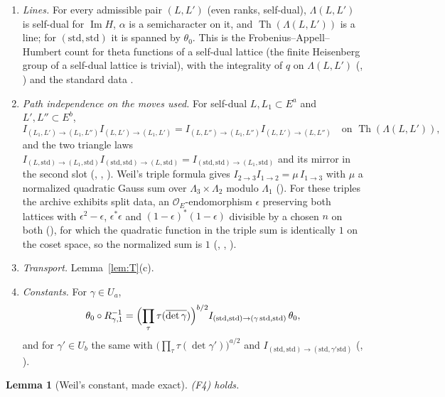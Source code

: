 \documentclass[11pt]{article}
\newcommand{\Th}{\operatorname{Th}}
\newcommand{\OEr}{\mathcal O_E}
\newtheorem{lemma}[theorem]{Lemma}
\theoremstyle{definition}
\theoremstyle{remark}
\begin{document}
\begin{enumerate}[label=(F\arabic*),leftmargin=*,itemsep=2pt]
\item \emph{Lines.} For every admissible pair $(L,L')$ (even ranks, self-dual), $\Lambda(L,L')$ is self-dual for $\operatorname{Im}H$, $\alpha$ is a semicharacter on it, and $\Th(\Lambda(L,L'))$ is a line; for $(\mathrm{std},\mathrm{std})$ it is spanned by $\theta_0$. This is the Frobenius--Appell--Humbert count for theta functions of a self-dual lattice (the finite Heisenberg group of a self-dual lattice is trivial), with the integrality of $q$ on $\Lambda(L,L')$ (, ) and the standard data .
\item \emph{Path independence on the moves used.} For self-dual $L,L_1\subset E^a$ and $L',L''\subset E^b$,
\[
I_{(L_1,L')\to(L_1,L'')}I_{(L,L')\to(L_1,L')}=I_{(L,L'')\to(L_1,L'')}I_{(L,L')\to(L,L'')}\quad\text{on }\Th(\Lambda(L,L')),
\]
and the two triangle laws $I_{(L,\mathrm{std})\to(L_1,\mathrm{std})}I_{(\mathrm{std},\mathrm{std})\to(L,\mathrm{std})}=I_{(\mathrm{std},\mathrm{std})\to(L_1,\mathrm{std})}$ and its mirror in the second slot (, , ). Weil's triple formula gives $I_{2\to3}I_{1\to2}=\mu\,I_{1\to3}$ with $\mu$ a normalized quadratic Gauss sum over $\Lambda_3\times\Lambda_2$ modulo $\Lambda_1$ (). For these triples the archive exhibits split data, an $\OEr$-endomorphism $\epsilon$ preserving both lattices with $\epsilon^2-\epsilon$, $\epsilon^*\epsilon$ and $(1-\epsilon)^*(1-\epsilon)$ divisible by a chosen $n$ on both (), for which the quadratic function in the triple sum is identically $1$ on the coset space, so the normalized sum is $1$ (, , ).
\item \emph{Transport.} Lemma~\ref{lem:T}(c).
\item \emph{Constants.} For $\gamma\in U_a$,
\[
\theta_0\circ R_{\gamma,1}^{-1}=\Bigl(\prod_\tau\tau(\overline{\det\gamma})\Bigr)^{b/2}I_{(\mathrm{std},\mathrm{std})\to(\gamma\,\mathrm{std},\mathrm{std})}\,\theta_0,
\]
and for $\gamma'\in U_b$ the same with $\bigl(\prod_\tau\tau(\det\gamma')\bigr)^{a/2}$ and $I_{(\mathrm{std},\mathrm{std})\to(\mathrm{std},\gamma'\mathrm{std})}$ (, ).
\end{enumerate}

\begin{lemma}[Weil's constant, made exact]\label{lem:W}
(F4) holds.
\end{lemma}
\end{document}

